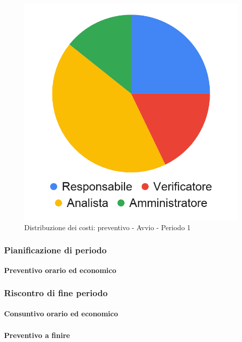 \hspace{-1cm}
\begin{minipage}{0.60\textwidth}
	\smallPreventivoTable{	
}
\end{minipage}
\begin{minipage}{.40\textwidth}
\begin{figure}[H]
	\includegraphics[scale=0.21]{res/images/charts/preventivo_priori/Grafico4-0.png}
	\caption{Distribuzione dei costi: preventivo - Avvio - Periodo 1}
\end{figure}
\end{minipage} 


\subsubsection{Pianificazione di periodo}

\paragraph{Preventivo orario ed economico}
\subparagraph*{}

\contabilitaTable{
	
}

\subsubsection{Riscontro di fine periodo}

\paragraph{Consuntivo orario ed economico}
\subparagraph*{}

\contabilitaTable{
	
}


\paragraph{Preventivo a finire}
\subparagraph*{}

\pafTable{
	
}

